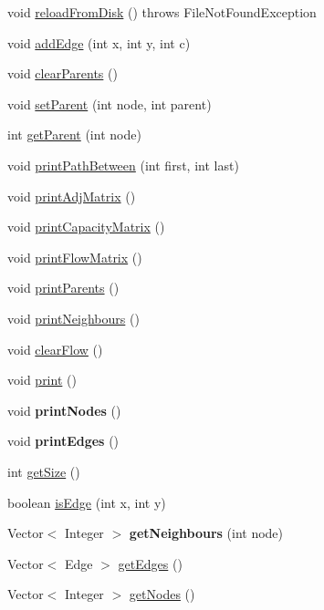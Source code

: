 \begin{DoxyCompactItemize}
\item 
void \hyperlink{classGraph_a2b4218e18d84fa35a65deb3f92f92b71}{reloadFromDisk} ()  throws FileNotFoundException 
\item 
void \hyperlink{classGraph_a6b0c9ae1efc61d18e9d0850de69007d7}{addEdge} (int x, int y, int c)
\item 
void \hyperlink{classGraph_ac9bac0b67df901c292a6cb7056c1b0d4}{clearParents} ()
\item 
void \hyperlink{classGraph_a84efbb4a0a7fa7f1b9aaa588cb03d454}{setParent} (int node, int parent)
\item 
int \hyperlink{classGraph_af44d0a95f60ebe3a674277f2cc02c339}{getParent} (int node)
\item 
void \hyperlink{classGraph_af3be08d7ab8ae3b8c7d8ea91263eaa20}{printPathBetween} (int first, int last)
\item 
void \hyperlink{classGraph_ae9af916770c65c6b60b582ffc563d8ed}{printAdjMatrix} ()
\item 
void \hyperlink{classGraph_afe6e5a59033d5c3eb35132df7723d8ff}{printCapacityMatrix} ()
\item 
void \hyperlink{classGraph_a7ca9ea178502d458dfe8412856f96342}{printFlowMatrix} ()
\item 
void \hyperlink{classGraph_ac27f2f6fdfad438bfdc73945847c9d35}{printParents} ()
\item 
void \hyperlink{classGraph_ad566bba341395b31350bcc67d43ac858}{printNeighbours} ()
\item 
void \hyperlink{classGraph_aad6e4deef302caff422a47c497e5c6b9}{clearFlow} ()
\item 
void \hyperlink{classGraph_a2ecf3dd3c4897aa924da8e5c221a8509}{print} ()
\item 
\hypertarget{classGraph_ac83f6a4edf0d503d387f59093692d719}{
void {\bfseries printNodes} ()}
\label{classGraph_ac83f6a4edf0d503d387f59093692d719}

\item 
\hypertarget{classGraph_a37a53b4ccf99d9a31976b62b3ab1eea2}{
void {\bfseries printEdges} ()}
\label{classGraph_a37a53b4ccf99d9a31976b62b3ab1eea2}

\item 
int \hyperlink{classGraph_ab7d965333f0ae9e6727676db3224ec4b}{getSize} ()
\item 
boolean \hyperlink{classGraph_ab19bf592d0e75e5863184a1c00c8f52a}{isEdge} (int x, int y)
\item 
\hypertarget{classGraph_aa5a714640bcc1e4c463d7dc8b0a1173c}{
Vector$<$ Integer $>$ {\bfseries getNeighbours} (int node)}
\label{classGraph_aa5a714640bcc1e4c463d7dc8b0a1173c}

\item 
Vector$<$ Edge $>$ \hyperlink{classGraph_a9e1ed7f7e8df8c0fd2be08f09e3da3f0}{getEdges} ()
\item 
Vector$<$ Integer $>$ \hyperlink{classGraph_a57fee445d59d45794cbe606a05c85da7}{getNodes} ()
\end{DoxyCompactItemize}
